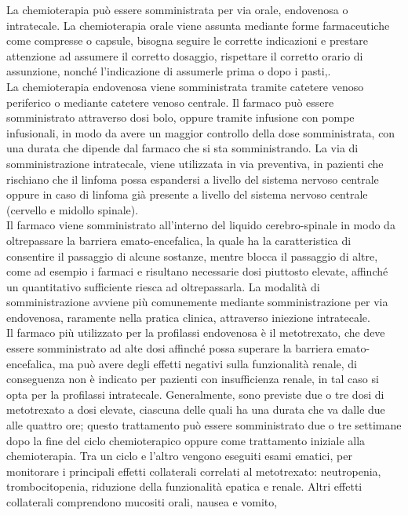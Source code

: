 La chemioterapia può essere somministrata per via orale, endovenosa o intratecale.
La chemioterapia orale viene assunta mediante forme farmaceutiche come compresse o capsule, bisogna seguire le 
corrette indicazioni e prestare attenzione ad assumere il corretto dosaggio, rispettare il corretto orario di 
assunzione, nonché l’indicazione di assumerle prima o dopo i pasti\cite{LYMPHACTION},\cite{CHEMOUK}.\\
La chemioterapia endovenosa viene somministrata tramite catetere venoso periferico o mediante catetere venoso centrale. 
Il farmaco può essere somministrato attraverso dosi bolo, oppure tramite infusione con pompe infusionali, in modo da 
avere un maggior controllo della dose somministrata, con una durata che dipende dal farmaco che si sta somministrando.
La via di somministrazione intratecale, viene utilizzata in via preventiva, in pazienti che rischiano che il linfoma 
possa espandersi a livello del sistema nervoso centrale oppure in caso di linfoma già presente a livello del sistema 
nervoso centrale (cervello e midollo spinale)\cite{LYMPHACTION}.\\
Il farmaco viene somministrato all’interno del liquido cerebro-spinale in modo da oltrepassare la barriera 
emato-encefalica, la quale ha la caratteristica di consentire il passaggio di alcune sostanze, mentre blocca il 
passaggio di altre, come ad esempio i farmaci e risultano necessarie dosi piuttosto elevate, affinché un quantitativo 
sufficiente riesca ad oltrepassarla. La modalità di somministrazione avviene più comunemente mediante 
somministrazione per via endovenosa, raramente nella pratica clinica, attraverso iniezione intratecale\cite{CNS}.\\
Il farmaco più utilizzato per la profilassi endovenosa è il metotrexato, che deve essere somministrato ad alte dosi 
affinché possa superare la barriera emato-encefalica, ma può avere degli effetti negativi sulla funzionalità renale, 
di conseguenza non è indicato per pazienti con insufficienza renale, in tal caso si opta per la profilassi intratecale.
Generalmente, sono previste due o tre dosi di metotrexato a dosi elevate, ciascuna delle quali ha una durata che va 
dalle due alle quattro ore; questo trattamento può essere somministrato due o tre settimane dopo la fine del ciclo 
chemioterapico oppure come trattamento iniziale alla chemioterapia. Tra un ciclo e l’altro vengono eseguiti esami 
ematici, per monitorare i principali effetti collaterali correlati al metotrexato: neutropenia, trombocitopenia, 
riduzione della funzionalità epatica e renale. Altri effetti collaterali comprendono mucositi orali, nausea e vomito, 
